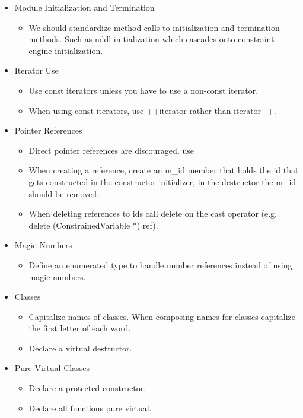 \documentclass[10pt, letterpaper, twoside]{article}
\begin{document}
\begin{itemize}
\item[] Module Initialization and Termination
 \begin{itemize}
  \item	We should standardize method calls to initialization and termination methods.  Such as nddl initialization which cascades onto constraint engine initialization.
 \end{itemize}

\item[] Iterator Use
 \begin{itemize}	 
  \item	 Use const iterators unless you have to use a non-const iterator. 
  \item	 When using const iterators, use ++iterator rather than iterator++.
 \end{itemize}

\item[] Pointer References
 \begin{itemize}	
  \item	Direct pointer references are discouraged, use 
  \item	When creating a reference, create an m\_id member that holds the id that gets constructed in the constructor initializer, in the destructor the m\_id should be removed.
  \item	When deleting references to ids call delete on the cast operator (e.g. delete (ConstrainedVariable *) ref).
 \end{itemize}

\item[] Magic Numbers
 \begin{itemize}      
  \item	Define an enumerated type to handle number references instead of using magic numbers.
 \end{itemize}

\item[] Classes
 \begin{itemize}
  \item	Capitalize names of classes.  When composing names for classes capitalize the first letter of each word.
  \item	Declare a virtual destructor.
 \end{itemize}

\item[] Pure Virtual Classes
 \begin{itemize}
  \item	Declare a protected constructor.
  \item	Declare all functions pure virtual.
 \end{itemize}


\end{itemize}
\end{document}
